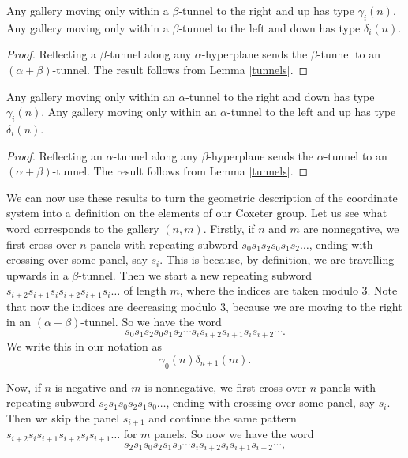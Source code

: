 \documentclass[11pt]{article}
\begin{document}
\begin{lemma}\label{tunnelsbeta}
    Any gallery moving only within a $\beta$-tunnel to the right and up has type 
    $\gamma_i(n)$.
    Any gallery moving only within a $\beta$-tunnel to the left and down has type 
    $\delta_i(n)$.
\end{lemma}

\begin{proof}
    Reflecting a $\beta$-tunnel along any $\alpha$-hyperplane sends the $\beta$-tunnel to an $(\alpha+\beta)$-tunnel. The result follows from Lemma \ref{tunnels}.
\end{proof}


\begin{lemma}\label{tunnelsalpha}
    Any gallery moving only within an $\alpha$-tunnel to the right and down has type 
    $\gamma_i(n)$.
    Any gallery moving only within an $\alpha$-tunnel to the left and up has type 
    $\delta_i(n)$.
\end{lemma}
\begin{proof}
    Reflecting an $\alpha$-tunnel along any $\beta$-hyperplane sends the $\alpha$-tunnel to an $(\alpha+\beta)$-tunnel. The result follows from Lemma \ref{tunnels}.
\end{proof}



We can now use these results to turn the geometric description of the coordinate system into a definition on the elements of our Coxeter group. Let us see what word corresponds to the gallery $(n,m)$. Firstly, if $n$ and $m$ are nonnegative, we first cross over $n$ panels with repeating subword $s_0s_1s_2s_0s_1s_2\hdots$, ending with crossing over some panel, say $s_i$. This is because, by definition, we are travelling upwards in a $\beta$-tunnel. Then we start a new repeating subword $s_{i+2}s_{i+1}s_{i}s_{i+2}s_{i+1}s_{i}\hdots$ of length $m$, where the indices are taken modulo 3. Note that now the indices are decreasing modulo 3, because we are moving to the right in an $(\alpha+\beta)$-tunnel. So we have the word
\[s_0s_1s_2s_0s_1s_2\cdots s_is_{i+2}s_{i+1}s_{i}s_{i+2}\cdots .\]
We write this in our notation as 
\[\gamma_0(n)\delta_{n+1}(m).\]

Now, if $n$ is negative and $m$ is nonnegative, we first cross over $n$ panels with repeating subword $s_2s_1s_0s_2s_1s_0\hdots$, ending with crossing over some panel, say $s_i$. Then we skip the panel $s_{i+1}$ and continue the same pattern $s_{i+2}s_is_{i+1}s_{i+2}s_is_{i+1}\hdots$ for $m$ panels. So now we have the word
\[s_2s_1s_0s_2s_1s_0\cdots s_is_{i+2}s_is_{i+1}s_{i+2}\cdots, \]
\end{document}
